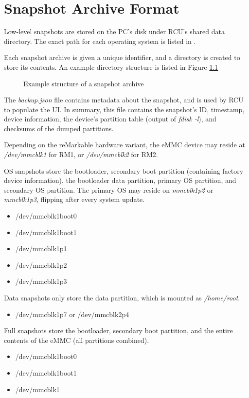 \newpage
\appendix

\chapter{Snapshot Archive Format}
\label{sec:snapshotarchiveformat}
Low-level snapshots are stored on the PC's disk under RCU's shared data directory. The exact path for each operating system is listed in .

Each snapshot archive is given a unique identifier, and a directory is created to store its contents. An example directory structure is listed in Figure \ref{fig:snapshotstructure}

\begin{figure}[h]
\caption{Example structure of a snapshot archive}
\label{fig:snapshotstructure}
\end{figure}

The \textit{backup.json} file contains metadata about the snapshot, and is used by RCU to populate the UI. In summary, this file contains the snapshot's ID, timestamp, device information, the device's partition table (output of \textit{fdisk -l}), and checksums of the dumped partitions.

Depending on the reMarkable hardware variant, the eMMC device may reside at \textit{/dev/mmcblk1} for RM1, or \textit{/dev/mmcblk2} for RM2.

OS snapshots store the bootloader, secondary boot partition (containing factory device information), the bootloader data partition, primary OS partition, and secondary OS partition. The primary OS may reside on \textit{mmcblk1p2} or \textit{mmcblk1p3}, flipping after every system update.

\begin{itemize}
\item{/dev/mmcblk1boot0}
\item{/dev/mmcblk1boot1}
\item{/dev/mmcblk1p1}
\item{/dev/mmcblk1p2}
\item{/dev/mmcblk1p3}
\end{itemize}

Data snapshots only store the data partition, which is mounted as \textit{/home/root}.

\begin{itemize}
\item{/dev/mmcblk1p7 or /dev/mmcblk2p4}
\end{itemize}

Full snapshots store the bootloader, secondary boot partition, and the entire contents of the eMMC (all partitions combined).

\begin{itemize}
\item{/dev/mmcblk1boot0}
\item{/dev/mmcblk1boot1}
\item{/dev/mmcblk1}
\end{itemize}


